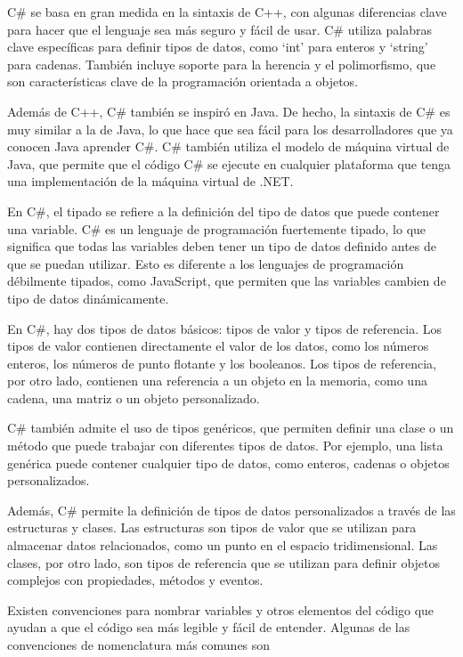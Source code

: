 \documentclass[executivepaper]{article}
\begin{document}
C\# se basa en gran medida en la sintaxis de C++, con algunas diferencias clave para hacer que el lenguaje sea más seguro y fácil de usar. C\# utiliza palabras clave específicas para definir tipos de datos, como \enquote*{int} para enteros y \enquote*{string} para cadenas. También incluye soporte para la herencia y el polimorfismo, que son características clave de la programación orientada a objetos.

Además de C++, C\# también se inspiró en Java. De hecho, la sintaxis de C\# es muy similar a la de Java, lo que hace que sea fácil para los desarrolladores que ya conocen Java aprender C\#. C\# también utiliza el modelo de máquina virtual de Java, que permite que el código C\# se ejecute en cualquier plataforma que tenga una implementación de la máquina virtual de .NET.

En C\#, el tipado se refiere a la definición del tipo de datos que puede contener una variable. C\# es un lenguaje de programación fuertemente tipado, lo que significa que todas las variables deben tener un tipo de datos definido antes de que se puedan utilizar. Esto es diferente a los lenguajes de programación débilmente tipados, como JavaScript, que permiten que las variables cambien de tipo de datos dinámicamente.

En C\#, hay dos tipos de datos básicos: tipos de valor y tipos de referencia. Los tipos de valor contienen directamente el valor de los datos, como los números enteros, los números de punto flotante y los booleanos. Los tipos de referencia, por otro lado, contienen una referencia a un objeto en la memoria, como una cadena, una matriz o un objeto personalizado.

C\# también admite el uso de tipos genéricos, que permiten definir una clase o un método que puede trabajar con diferentes tipos de datos. Por ejemplo, una lista genérica puede contener cualquier tipo de datos, como enteros, cadenas o objetos personalizados.

Además, C\# permite la definición de tipos de datos personalizados a través de las estructuras y clases. Las estructuras son tipos de valor que se utilizan para almacenar datos relacionados, como un punto en el espacio tridimensional. Las clases, por otro lado, son tipos de referencia que se utilizan para definir objetos complejos con propiedades, métodos y eventos.

Existen convenciones para nombrar variables y otros elementos del código que ayudan a que el código sea más legible y fácil de entender. Algunas de las convenciones de nomenclatura más comunes son
\end{document}

